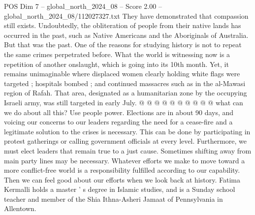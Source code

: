 \begin{textsample}{POS Dim 7 – global\_north\_2024\_08 – Score 2.00 – global\_north\_2024\_08/112027327.txt}
They have demonstrated that compassion still exists.
Undoubtedly, the obliteration of people from their native lands has occurred in the past, such as Native Americans and the Aboriginals of Australia.
But that was the past.
One of the reasons for studying history is not to repeat the same crimes perpetrated before.
What the world is witnessing now is a repetition of another onslaught, which is going into its 10th month.
Yet, it remains unimaginable where displaced women clearly holding white flags were targeted ; hospitals bombed ; and continued massacres such as in the al-Mawasi region of Rafah.
That area, designated as a humanitarian zone by the occupying Israeli army, was still targeted in early July. @ @ @ @ @ @ @ @ @ @ what can we do about all this?
Use people power.
Elections are in about 90 days, and voicing our concerns to our leaders regarding the need for a cease-fire and a legitimate solution to the crises is necessary.
This can be done by participating in protest gatherings or calling government officials at every level.
Furthermore, we must elect leaders that remain true to a just cause.
Sometimes shifting away from main party lines may be necessary.
Whatever efforts we make to move toward a more conflict-free world is a responsibility fulfilled according to our capability.
Then we can feel good about our efforts when we look back at history.
Fatima Kermalli holds a master ' s degree in Islamic studies, and is a Sunday school teacher and member of the Shia Ithna-Asheri Jamaat of Pennsylvania in Allentown.

\end{textsample}
